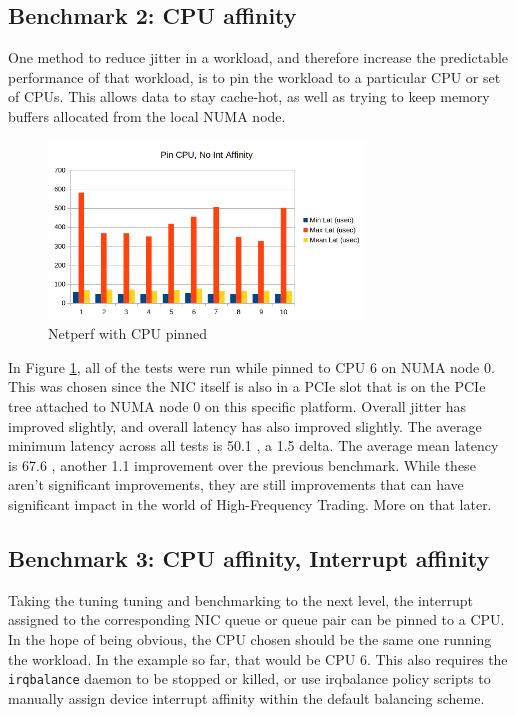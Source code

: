 \documentclass[letterpaper]{article}
\begin{document}
{{\subsection{Benchmark 2: CPU affinity}
One method to reduce jitter in a workload, and therefore increase the predictable performance of that workload, is to pin the workload to a particular CPU or set of CPUs. This allows data to stay cache-hot, as well as trying to keep memory buffers allocated from the local NUMA node.

\begin{figure}[h]
\includegraphics[width=3.31in]{netperf-cpu-pin-no-int-affinity.png}
\caption{Netperf with CPU pinned}
\label{netperf-cpu-pin-no-int-affinity}
\end{figure}

In Figure \ref{netperf-cpu-pin-no-int-affinity}, all of the tests were run while pinned to CPU 6 on NUMA node 0. This was chosen since the NIC itself is also in a PCIe slot that is on the PCIe tree attached to NUMA node 0 on this specific platform.
\newline
\newline
Overall jitter has improved slightly, and overall latency has also improved slightly.  The average minimum latency across all tests is 50.1 , a 1.5  delta. The average mean latency is 67.6 , another 1.1  improvement over the previous benchmark. While these aren't significant improvements, they are still improvements that can have significant impact in the world of High-Frequency Trading.  More on that later.

\subsection{Benchmark 3: CPU affinity, Interrupt affinity}
Taking the tuning tuning and benchmarking to the next level, the interrupt assigned to the corresponding NIC queue or queue pair can be pinned to a CPU. In the hope of being obvious, the CPU chosen should be the same one running the workload. In the example so far, that would be CPU 6.  This also requires the {\small \texttt{irqbalance}} daemon to be stopped or killed, or use irqbalance policy scripts \cite{irqbalance} to manually assign device interrupt affinity within the default balancing scheme.

}}
\end{document}
